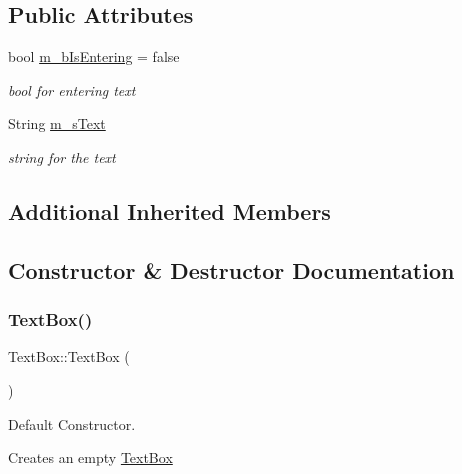 \subsection*{Public Attributes}
\begin{DoxyCompactItemize}
\item 
\hypertarget{class_text_box_a9bd587d5dda491ff96bb5ef4497eb406}{}\label{class_text_box_a9bd587d5dda491ff96bb5ef4497eb406} 
bool \hyperlink{class_text_box_a9bd587d5dda491ff96bb5ef4497eb406}{m\+\_\+b\+Is\+Entering} = false
\begin{DoxyCompactList}\small\item\em bool for entering text \end{DoxyCompactList}\item 
\hypertarget{class_text_box_a79dde249421f3a5b26f52bbf59f9f2c3}{}\label{class_text_box_a79dde249421f3a5b26f52bbf59f9f2c3} 
String \hyperlink{class_text_box_a79dde249421f3a5b26f52bbf59f9f2c3}{m\+\_\+s\+Text}
\begin{DoxyCompactList}\small\item\em string for the text \end{DoxyCompactList}\end{DoxyCompactItemize}
\subsection*{Additional Inherited Members}


\subsection{Constructor \& Destructor Documentation}
\hypertarget{class_text_box_a25b67e5ff6788c60b8aef3f3540879d0}{}\label{class_text_box_a25b67e5ff6788c60b8aef3f3540879d0} 
\subsubsection{\texorpdfstring{Text\+Box()}{TextBox()}\hspace{0.1cm}{\footnotesize\ttfamily [1/2]}}
{\footnotesize\ttfamily Text\+Box\+::\+Text\+Box (\begin{DoxyParamCaption}{ }\end{DoxyParamCaption})}



Default Constructor. 

Creates an empty \hyperlink{class_text_box}{Text\+Box} \hypertarget{class_text_box_a9df04c5eb70d4d6b75907c56ecce6d8e}{}\label{class_text_box_a9df04c5eb70d4d6b75907c56ecce6d8e} 

